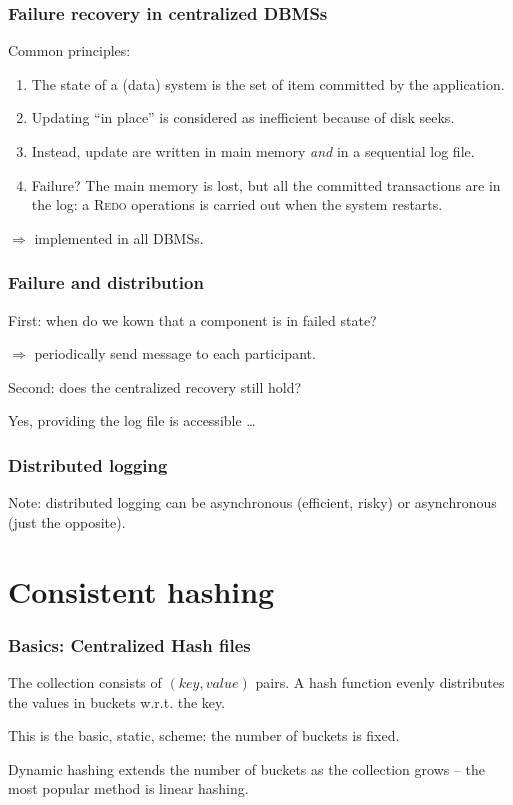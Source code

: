 \documentclass{beamer}
\begin{document}
\begin{frame}
\frametitle{Failure recovery in centralized DBMSs}

Common principles:

\begin{enumerate}
  \item The \alert{state} of a (data) system is the set of item 
  committed by the application.
  \item Updating ``in place'' is considered as inefficient because of disk
  seeks.
  \item Instead, update are written in main memory \emph{and} in a sequential
  \alert{log file}.
  \item Failure? The main memory is lost, but all the committed  transactions
  are in the log: a \textsc{Redo} operations is carried out when the system
  restarts.
\end{enumerate}

$\Rightarrow$ implemented in all DBMSs.
\end{frame}

\begin{frame}
\frametitle{Failure and distribution}

First: when do we kown that a component is in failed state?

\vfill
$\Rightarrow$ periodically send message to each participant.

\vfill
Second: does the centralized recovery still hold?

\vfill

Yes, providing the log file is accessible \ldots

\end{frame}


\begin{frame}
\frametitle{Distributed logging}



Note: distributed logging can be asynchronous (efficient, risky)
or asynchronous (just the opposite).

\end{frame}

\section{Consistent hashing}


\begin{frame}
\frametitle{Basics: Centralized Hash files}

The collection consists of $(key, value)$ pairs. A \alert{hash function} evenly
distributes the values in \alert{buckets} w.r.t. the key.

\vfill 


\vfill

This is the basic, \alert{static}, scheme: the number of buckets is fixed.

\vfill

\alert{Dynamic hashing} extends the number of buckets as the collection grows --
the most popular method is \alert{linear hashing}.

\end{frame}
\end{document}

